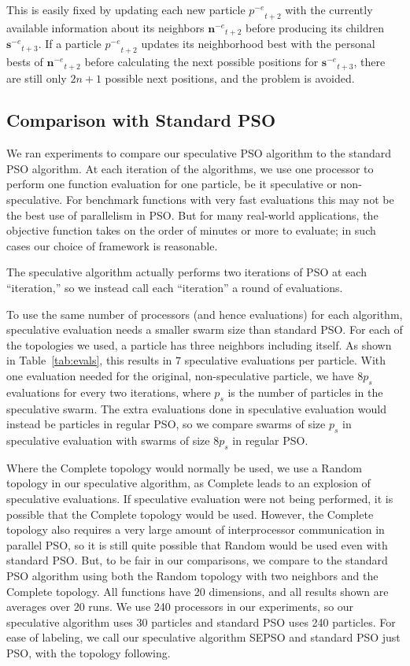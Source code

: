 \documentclass[journal,letterpaper]{IEEEtran}
\providecommand{\noeval}[1]{\ensuremath{#1^{-e}}}
\providecommand{\p}{\ensuremath{p}}
\providecommand{\sset}{\ensuremath{\mathbf{s}}}
\providecommand{\nset}{\ensuremath{\mathbf{n}}}
\begin{document}
This is easily fixed by updating each new particle $\noeval{\p}_{t+2}$ with the
currently available information about its neighbors $\noeval{\nset}_{t+2}$
before producing its children $\noeval{\sset}_{t+3}$.  If a particle
$\noeval{\p}_{t+2}$ updates its neighborhood best with the personal bests of
$\noeval{\nset}_{t+2}$ before calculating the next possible positions for
$\noeval{\sset}_{t+3}$, there are still only $2n+1$ possible next positions,
and the problem is avoided.

\subsection{Comparison with Standard PSO}
\label{sec:results}

We ran experiments to compare our speculative PSO algorithm to the standard PSO
algorithm.  At each iteration of the algorithms, we use one processor to
perform one function evaluation for one particle, be it speculative or
non-speculative.  For benchmark functions with very fast evaluations this may
not be the best use of parallelism in PSO.  But for many real-world
applications, the objective function takes on the order of minutes or more to
evaluate; in such cases our choice of framework is reasonable.

The speculative algorithm actually performs two iterations of PSO at each
``iteration,'' so we instead call each ``iteration'' a round of evaluations.

To use the same number of processors (and hence evaluations) for each
algorithm, speculative evaluation needs a smaller swarm size than standard PSO.
For each of the topologies we used, a particle has three neighbors including
itself.  As shown in Table~\ref{tab:evals}, this results in $7$ speculative
evaluations per particle.  With one evaluation needed for the original,
non-speculative particle, we have $8p_s$ evaluations for every two iterations,
where $p_s$ is the number of particles in the speculative swarm.  The extra
evaluations done in speculative evaluation would instead be particles in
regular PSO, so we compare swarms of size $p_s$ in speculative evaluation with
swarms of size $8p_s$ in regular PSO.

Where the Complete topology would normally be used, we use a Random topology in
our speculative algorithm, as Complete leads to an explosion of speculative
evaluations.  If speculative evaluation were not being performed, it is
possible that the Complete topology would be used.  However, the Complete
topology also requires a very large amount of interprocessor communication in
parallel PSO, so it is still quite possible that Random would be used even with
standard PSO.  But, to be fair in our comparisons, we compare to the standard
PSO algorithm using both the Random topology with two neighbors and the
Complete topology.  All functions have 20 dimensions, and all results shown are
averages over 20 runs.  We use 240 processors in our experiments, so our
speculative algorithm uses 30 particles and standard PSO uses 240 particles.
For ease of labeling, we call our speculative algorithm SEPSO and standard PSO
just PSO, with the topology following.
\end{document}
